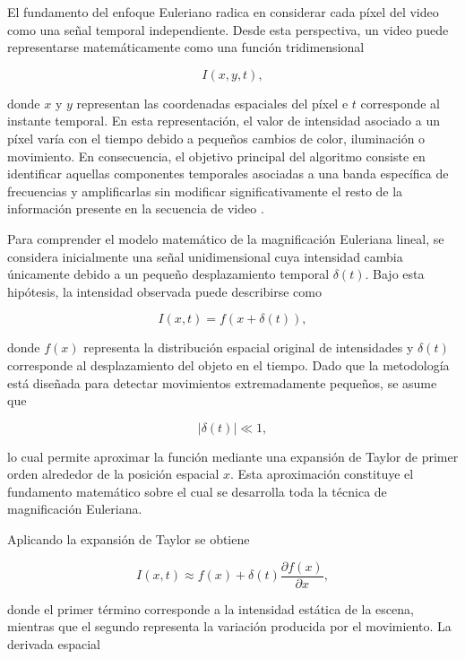 El fundamento del enfoque Euleriano radica en considerar cada píxel del video como una señal temporal independiente. Desde esta perspectiva, un video puede representarse matemáticamente como una función tridimensional

\begin{equation}
I(x,y,t),
\end{equation}

donde $x$ y $y$ representan las coordenadas espaciales del píxel e $t$ corresponde al instante temporal. En esta representación, el valor de intensidad asociado a un píxel varía con el tiempo debido a pequeños cambios de color, iluminación o movimiento. En consecuencia, el objetivo principal del algoritmo consiste en identificar aquellas componentes temporales asociadas a una banda específica de frecuencias y amplificarlas sin modificar significativamente el resto de la información presente en la secuencia de video \cite{wu2012eulerian,ahmed2023overview}.

Para comprender el modelo matemático de la magnificación Euleriana lineal, se considera inicialmente una señal unidimensional cuya intensidad cambia únicamente debido a un pequeño desplazamiento temporal $\delta(t)$. Bajo esta hipótesis, la intensidad observada puede describirse como

\begin{equation}
I(x,t)=f(x+\delta(t)),
\label{eq:evm_signal}
\end{equation}

donde $f(x)$ representa la distribución espacial original de intensidades y $\delta(t)$ corresponde al desplazamiento del objeto en el tiempo. Dado que la metodología está diseñada para detectar movimientos extremadamente pequeños, se asume que

\[
|\delta(t)| \ll 1,
\]

lo cual permite aproximar la función mediante una expansión de Taylor de primer orden alrededor de la posición espacial $x$. Esta aproximación constituye el fundamento matemático sobre el cual se desarrolla toda la técnica de magnificación Euleriana.

Aplicando la expansión de Taylor se obtiene

\begin{equation}
I(x,t)\approx f(x)+\delta(t)\frac{\partial f(x)}{\partial x},
\label{eq:taylor}
\end{equation}

donde el primer término corresponde a la intensidad estática de la escena, mientras que el segundo representa la variación producida por el movimiento. La derivada espacial

